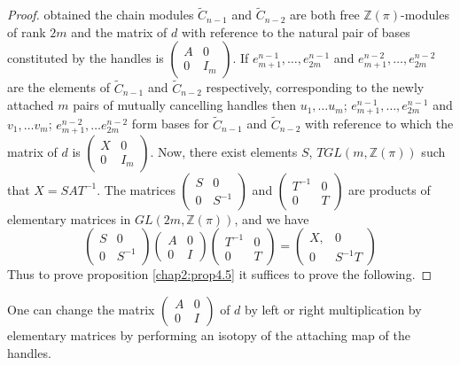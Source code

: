 \begin{proof}
obtained the chain modules $\tilde{C}_{n-1}$ and $\tilde{C}_{n-2}$ are
both free $\mathbb{Z}(\pi)$-modules of rank $2m$ and the matrix of $d$
with reference to the natural pair of bases constituted by the handles
is $\left( \begin{smallmatrix} A& 0\\ 0 &
  I_m \end{smallmatrix}\right)$. If $e^{n-1}_{m+1}, \ldots ,
e^{n-1}_{2m}$ and $e^{n-2}_{m+1}, \ldots , e^{n-2}_{2m}$ are the
elements of $\tilde{C}_{n-1}$ and $\tilde{C}_{n-2}$ respectively,
corresponding to the newly attached $m$ pairs of mutually cancelling
handles then $u_1, \ldots u_m$; $e_{m+1}^{n-1}, \ldots, e_{2m}^{n-1}$
and $v_1, \ldots v_m$; $e_{m+1}^{n-2}, \ldots e_{2m}^{n-2}$ form bases
for $\tilde{C}_{n-1}$ and $\tilde{C}_{n-2}$ with reference to which
the matrix of $d$ is $\left( \begin{smallmatrix} X & 0\\ 0 &
  I_m \end{smallmatrix}\right)$. Now, there exist elements $S$, $T
GL(m, \mathbb{Z}(\pi))$ such that $X = S A T^{-1}$. The
matrices\pageoriginale 
$\left (\begin{smallmatrix} S & 0\\ 0 & S^{-1} \end{smallmatrix}
\right)$ and $\left( \begin{smallmatrix} T^{-1} & 0\\ 0 &
  T\end{smallmatrix} \right)$ are products of elementary matrices in
  $GL(2m, \mathbb{Z}(\pi))$, and we have 
$$ 
\begin{pmatrix}
S & 0 \\ 
0 & S^{-1}
\end{pmatrix}
\begin{pmatrix}
A & 0\\ 
0 & I \end{pmatrix}
\begin{pmatrix}
T^{-1} & 0\\ 
0 & T\end{pmatrix}
=\begin{pmatrix}
X, & 0\\ 
0 & S^{-1} T
\end{pmatrix}
$$
Thus to prove proposition \ref{chap2:prop4.5} it suffices to prove the following. 
\end{proof}

\setcounter{lemma}{5}
\begin{lemma}\label{chap2:lem4.6}%
One can change the matrix $\left( \begin{smallmatrix}A & 0\\ 0 &
  I\end{smallmatrix}\right)$ of $d$ by left or right multiplication by
  elementary matrices by performing an isotopy of the attaching map of
  the handles. 
\end{lemma}

